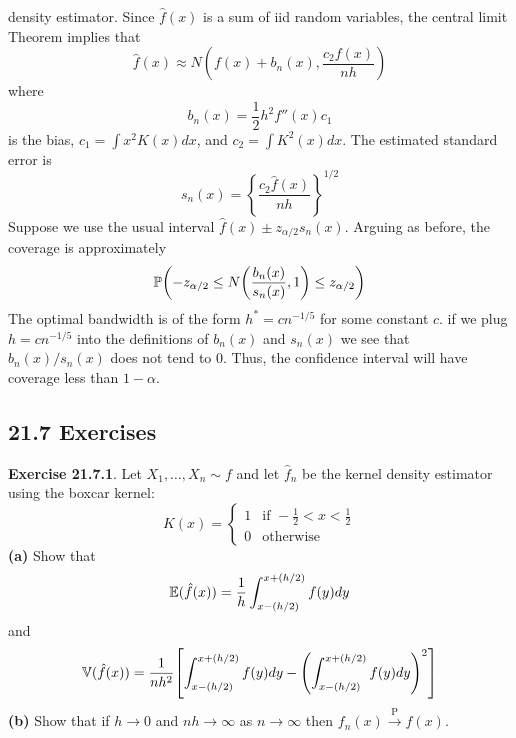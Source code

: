 density estimator. Since \(\hat{f}(x)\) is a sum of iid random
variables, the central limit Theorem implies that
\[
\hat{f}(x) \approx N \left( f(x) + b_{n}(x), \frac{c_{2} f(x)}{nh} \right)
\]
where
\[
b_{n}(x) = \frac{1}{2} h^{2} f''(x) c_{1}
\]
is the bias, \(c_{1} = \int x^{2} K(x) dx\), and \(c_{2} = \int K^{2}(x) dx\).
The estimated standard error is
\[
s_{n}(x) = \left\{ \frac{c_{2} \hat{f}(x)}{nh} \right\}^{1/2}
\]
Suppose we use the usual interval
\(\hat{f}(x) \pm z_{\alpha/2} s_{n}(x)\). Arguing as before, the coverage
is approximately
\[
\PROB\left(-z_{\alpha/2} \leq N\left(\frac{b_{n}(x)}{s_{n}(x)}, 1\right) \leq z_{\alpha/2} \right)
\]
The optimal bandwidth is of the form \(h^{*} = cn^{-1/5}\) for some
constant \(c\). if we plug \(h = cn^{-1/5}\) into the definitions of
\(b_{n}(x)\) and \(s_{n}(x)\) we see that \(b_{n}(x) / s_{n}(x)\) does not tend
to 0. Thus, the confidence interval will have coverage less than
\(1 - \alpha\).

\subsection*{21.7 Exercises}

\textbf{Exercise 21.7.1}. Let \(X_{1}, \dots, X_{n} \sim f\) and let
\(\hat{f}_{n}\) be the kernel density estimator using the boxcar kernel:
\[
K(x) = \begin{cases}
1 & \text{if } -\frac{1}{2} < x < \frac{1}{2} \\
0 & \text{otherwise}
\end{cases}
\]
\textbf{(a)} Show that
\[
\operatorname{\mathbb{E}}(\hat{f}(x)) = \frac{1}{h} \int_{x-(h/2)}^{x+(h/2)} f(y) dy
\]
and
\[
\VAR(\hat{f}(x)) = \frac{1}{nh^{2}} \left[ \int_{x-(h/2)}^{x+(h/2)} f(y) dy  - \left( \int_{x-(h/2)}^{x+(h/2)} f(y) dy \right)^{2}\right]
\]
\textbf{(b)} Show that if \(h \rightarrow 0\) and
\(nh \rightarrow \infty\) as \(n \rightarrow \infty\) then
\(f_{n}(x) \xrightarrow{\textrm{P}} f(x)\).

